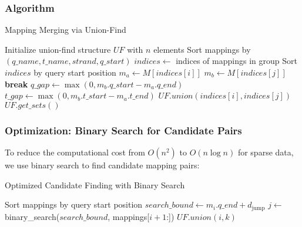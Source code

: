 \documentclass[11pt]{article}
\begin{document}
\subsubsection{Algorithm}

\begin{algorithm}
\caption{Mapping Merging via Union-Find}
\begin{algorithmic}[1]
\STATE Initialize union-find structure $UF$ with $n$ elements
\STATE Sort mappings by $(q\_name, t\_name, strand, q\_start)$
    \STATE $indices \gets$ indices of mappings in group
    \STATE Sort $indices$ by query start position
            \STATE $m_a \gets M[indices[i]]$
            \STATE $m_b \gets M[indices[j]]$
                \STATE \textbf{break} 
            \ENDIF
            \STATE $q\_gap \gets \max(0, m_b.q\_start - m_a.q\_end)$
            \STATE $t\_gap \gets \max(0, m_b.t\_start - m_a.t\_end)$
                \STATE $UF.union(indices[i], indices[j])$
            \ENDIF
        \ENDFOR
    \ENDFOR
\ENDFOR
\RETURN $UF.get\_sets()$
\end{algorithmic}
\end{algorithm}

\subsubsection{Optimization: Binary Search for Candidate Pairs}

To reduce the computational cost from $O(n^2)$ to $O(n \log n)$ for sparse data, we use binary search to find candidate mapping pairs:

\begin{algorithm}
\caption{Optimized Candidate Finding with Binary Search}
\begin{algorithmic}[1]
\STATE Sort mappings by query start position
    \STATE $search\_bound \gets m_i.q\_end + d_{\text{jump}}$
    \STATE $j \gets$ binary\_search($search\_bound$, mappings[$i+1$:])
            \STATE $UF.union(i, k)$
        \ENDIF
    \ENDFOR
\ENDFOR
\end{algorithmic}
\end{algorithm}
\end{document}
